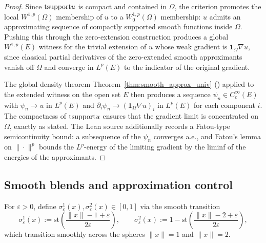 \begin{proof}
\leanok
{}

Since $\mathrm{tsupport} u$ is compact and contained in $\Omega$, the criterion
 promotes the local
$W^{1,p}(\Omega)$ membership of $u$ to a $W^{1,p}_0(\Omega)$ membership: $u$
admits an approximating sequence of compactly supported smooth functions
inside $\Omega$. Pushing this through the zero-extension construction
 produces a global $W^{1,p}(E)$ witness for
the trivial extension of $u$ whose weak gradient is $\mathbf{1}_\Omega
\nabla u$, since classical partial derivatives of the zero-extended smooth
approximants vanish off $\Omega$ and converge in $L^p(E)$ to the indicator
of the original gradient.

The global density theorem
Theorem~\ref{thm:smooth_approx_univ}
() applied to the
extended witness on the open set $E$ then produces a sequence
$\psi_n \in C^\infty_c(E)$ with $\psi_n \to u$ in $L^p(E)$ and
$\partial_i \psi_n \to (\mathbf{1}_\Omega \nabla u)_i$ in $L^p(E)$ for each
component $i$. The compactness of $\mathrm{tsupport} u$ ensures that the gradient
limit is concentrated on $\Omega$, exactly as stated. The Lean source
additionally records a Fatou-type semicontinuity bound: a subsequence of the
$\psi_n$ converges a.e., and Fatou's lemma on $\|\cdot\|^p$ bounds the
$L^p$-energy of the limiting gradient by the liminf of the energies of the
approximants.
\end{proof}

\subsection*{Smooth blends and approximation control}

\begin{definition}
\label{def:SmoothApproximationInternal_sphereOneBlend}
\leanok
{}
For $\varepsilon > 0$, define $\sigma^1_\varepsilon(x), \sigma^2_\varepsilon(x)
\in [0,1]$ via the smooth transition
\begin{equation*}
\sigma^1_\varepsilon(x) := \mathrm{st}\!\left(\frac{\|x\|-1+\varepsilon}{2\varepsilon}\right),
\qquad
\sigma^2_\varepsilon(x) := 1 - \mathrm{st}\!\left(\frac{\|x\|-2+\varepsilon}{2\varepsilon}\right),
\end{equation*}
which transition smoothly across the spheres $\|x\|=1$ and $\|x\|=2$.
\end{definition}

